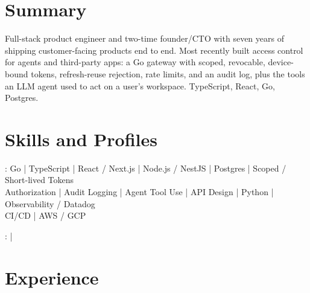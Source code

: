 \documentclass[print]{jack-resume}
\begin{document}
\pagecolor{darkmodeBackground}


\begin{minipage}[t][1cm][t]{.03\textwidth}
    \hfill
\end{minipage}

\section{Summary}
Full-stack product engineer and two-time founder/CTO with seven years of shipping customer-facing products end to end. Most recently built access control for agents and third-party apps: a Go gateway with scoped, revocable, device-bound tokens, refresh-reuse rejection, rate limits, and an audit log, plus the tools an LLM agent used to act on a user's workspace. TypeScript, React, Go, Postgres.
\sectionsep

\section{Skills and Profiles}
:
Go \hfill | \hfill
TypeScript \hfill | \hfill
React / Next.js \hfill | \hfill
Node.js / NestJS \hfill | \hfill
Postgres \hfill | \hfill
Scoped / Short-lived Tokens \\
\hspace{1.0cm} Authorization \hfill | \hfill
Audit Logging \hfill | \hfill
Agent Tool Use \hfill | \hfill
API Design \hfill | \hfill
Python \hfill | \hfill
Observability / Datadog \\
\hspace{1.0cm} CI/CD \hfill | \hfill
AWS / GCP \\

\raggedright{
    :
      \href{https://www.linkedin.com/in/jack-sturtevant/}{ \ExternalLink} |
     \href{https://github.com/jacksturt}{ \ExternalLink}}

\section{Experience}
\end{document}
